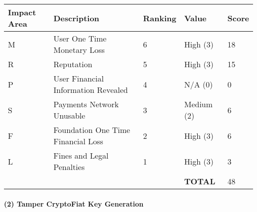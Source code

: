 \documentclass[12pt]{article} %
\begin{document}
{\begin{center}
\begin{tabular}{ | l | l | l | l | l |}
  \hline
  \textbf{Impact Area} & \textbf{Description} & \textbf{Ranking} & \textbf{Value} & \textbf{Score}
  \\ \hline
  M & User One Time Monetary Loss			& 6	& High (3)		& 18
  \\ \hline
  R & Reputation		& 5	& High (3)		& 15
  \\ \hline
  P & User Financial Information Revealed		& 4	& N/A (0)		& 0
  \\ \hline
  S & Payments Network Unusable					& 3	& Medium (2)	& 6
  \\ \hline
  F & Foundation One Time Financial Loss	& 2	& High (3)		& 6
  \\ \hline
  L & Fines and Legal Penalties						& 1	& High (3)		& 3
  \\ \hline
  & & & \textbf{TOTAL} & 48
  \\ \hline
\end{tabular}
\end{center}
\label{tab:severityStealAdminKeyFromOnlineServer}

\paragraph{(2) Tamper CryptoFiat Key Generation }

}
\end{document}
